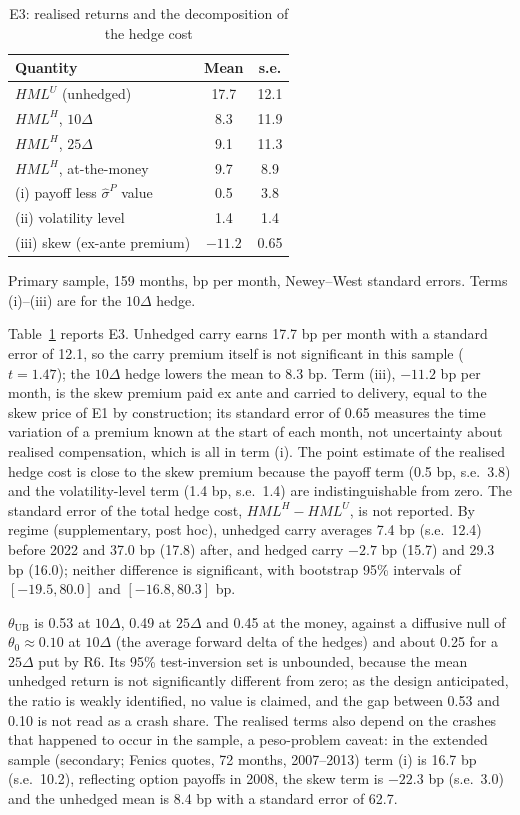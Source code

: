 \documentclass[11pt]{article}
\theoremstyle{result}
\newcommand{\HML}{\mathit{HML}}
\newcommand{\thUB}{\theta_{\mathrm{UB}}}
\newcommand{\sigP}{\hat\sigma^{P}}
\newcommand{\D}{\Delta}
\begin{document}
\begin{table}[t]
\centering\small
\caption{E3: realised returns and the decomposition of the hedge cost}\label{tab:e3}
\begin{tabular}{lcc}
\toprule
Quantity & Mean & s.e. \\
\midrule
$\HML^U$ (unhedged) & 17.7 & 12.1 \\
$\HML^H$, $10\D$ & 8.3 & 11.9 \\
$\HML^H$, $25\D$ & 9.1 & 11.3 \\
$\HML^H$, at-the-money & 9.7 & 8.9 \\
\midrule
(i) payoff less $\sigP$ value & 0.5 & 3.8 \\
(ii) volatility level & 1.4 & 1.4 \\
(iii) skew (ex-ante premium) & $-11.2$ & 0.65 \\
\bottomrule
\end{tabular}
\par\medskip
\begin{minipage}{0.6\linewidth}\footnotesize
Primary sample, 159 months, bp per month, Newey--West standard errors. Terms (i)--(iii) are for the $10\D$ hedge.
\end{minipage}
\end{table}

Table~\ref{tab:e3} reports E3. Unhedged carry earns 17.7 bp per month with a standard error of 12.1, so the carry premium itself is not significant in this sample ($t=1.47$); the $10\D$ hedge lowers the mean to 8.3 bp. Term (iii), $-11.2$ bp per month, is the skew premium paid ex ante and carried to delivery, equal to the skew price of E1 by construction; its standard error of 0.65 measures the time variation of a premium known at the start of each month, not uncertainty about realised compensation, which is all in term (i). The point estimate of the realised hedge cost is close to the skew premium because the payoff term (0.5 bp, s.e.\ 3.8) and the volatility-level term (1.4 bp, s.e.\ 1.4) are indistinguishable from zero. The standard error of the total hedge cost, $\HML^H-\HML^U$, is not reported. By regime (supplementary, post hoc), unhedged carry averages 7.4 bp (s.e.\ 12.4) before 2022 and 37.0 bp (17.8) after, and hedged carry $-2.7$ bp (15.7) and 29.3 bp (16.0); neither difference is significant, with bootstrap 95\% intervals of $[-19.5,80.0]$ and $[-16.8,80.3]$ bp.

$\thUB$ is 0.53 at $10\D$, 0.49 at $25\D$ and 0.45 at the money, against a diffusive null of $\theta_0\approx0.10$ at $10\D$ (the average forward delta of the hedges) and about 0.25 for a $25\D$ put by R6. Its 95\% test-inversion set is unbounded, because the mean unhedged return is not significantly different from zero; as the design anticipated, the ratio is weakly identified, no value is claimed, and the gap between 0.53 and 0.10 is not read as a crash share. The realised terms also depend on the crashes that happened to occur in the sample, a peso-problem caveat: in the extended sample (secondary; Fenics quotes, 72 months, 2007--2013) term (i) is 16.7 bp (s.e.\ 10.2), reflecting option payoffs in 2008, the skew term is $-22.3$ bp (s.e.\ 3.0) and the unhedged mean is 8.4 bp with a standard error of 62.7.
\end{document}
